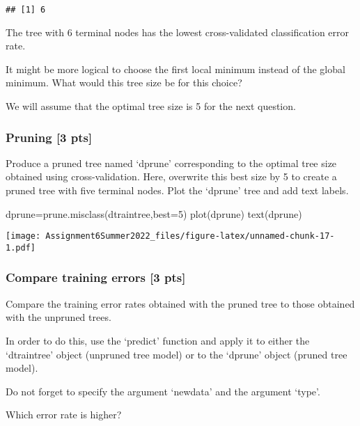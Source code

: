 \documentclass[
]{article}
\newenvironment{Shaded}{\begin{snugshade}}{\end{snugshade}}
\newcommand{\AttributeTok}[1]{\textcolor[rgb]{0.77,0.63,0.00}{#1}}
\newcommand{\DecValTok}[1]{\textcolor[rgb]{0.00,0.00,0.81}{#1}}
\newcommand{\FunctionTok}[1]{\textcolor[rgb]{0.00,0.00,0.00}{#1}}
\newcommand{\NormalTok}[1]{#1}
\newcommand{\OtherTok}[1]{\textcolor[rgb]{0.56,0.35,0.01}{#1}}
\begin{document}
\begin{verbatim}
## [1] 6
\end{verbatim}

The tree with 6 terminal nodes has the lowest cross-validated
classification error rate.

It might be more logical to choose the first local minimum instead of
the global minimum. What would this tree size be for this choice?

We will assume that the optimal tree size is 5 for the next question.

\hypertarget{pruning-3-pts}{%
\subsubsection{Pruning {[}3 pts{]}}\label{pruning-3-pts}}

Produce a pruned tree named `dprune' corresponding to the optimal tree
size obtained using cross-validation. Here, overwrite this best size by
5 to create a pruned tree with five terminal nodes. Plot the `dprune'
tree and add text labels.

\begin{Shaded}
\begin{Highlighting}[]
\NormalTok{dprune}\OtherTok{=}\FunctionTok{prune.misclass}\NormalTok{(dtraintree,}\AttributeTok{best=}\DecValTok{5}\NormalTok{)}
\FunctionTok{plot}\NormalTok{(dprune)}
\FunctionTok{text}\NormalTok{(dprune)}
\end{Highlighting}
\end{Shaded}

\texttt{[image: Assignment6Summer2022\_files/figure-latex/unnamed-chunk-17-1.pdf]}

\hypertarget{compare-training-errors-3-pts}{%
\subsubsection{Compare training errors {[}3
pts{]}}\label{compare-training-errors-3-pts}}

Compare the training error rates obtained with the pruned tree to those
obtained with the unpruned trees.

In order to do this, use the `predict' function and apply it to either
the `dtraintree' object (unpruned tree model) or to the `dprune' object
(pruned tree model).

Do not forget to specify the argument `newdata' and the argument `type'.

Which error rate is higher?
\end{document}
